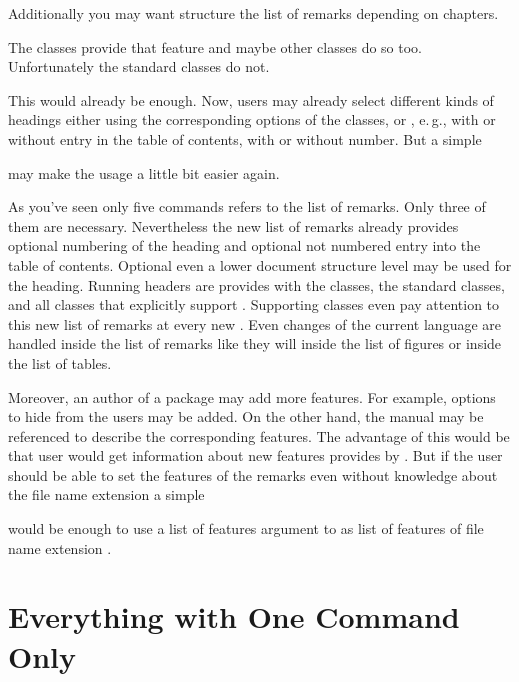 Additionally you may want structure the list of
remarks depending on chapters.
\begin{lstcode}
\end{lstcode}
The \KOMAScript{} classes provide that feature and maybe other classes do so
too. Unfortunately the standard classes do not.

This would already be enough. Now, users may already
select different kinds of headings either using the corresponding options of
the \KOMAScript{} classes, or , e.\,g., with or without entry
in the table of contents, with or without number. But a simple
\begin{lstcode}
  \newcommand*{\listofremarkboxes}{\listoftoc{lor}}
\end{lstcode}
may make the usage a little bit easier again.

As you've seen only five commands refers to the list of remarks. Only three of
them are necessary. Nevertheless the new list of remarks already provides
optional numbering of the heading and optional not numbered entry into the
table of contents. Optional even a lower document structure level may be used
for the heading. Running headers are provides with the \KOMAScript{} classes,
the standard classes, and all classes that explicitly support
. Supporting classes even pay attention to this new list of
remarks at every new . Even changes of the
current language are handled inside the list of remarks like they will inside
the list of figures or inside the list of tables.

Moreover, an author of a package may add more
features. For example, options to hide  from the users may be
added. On the other hand, the  manual may be referenced to
describe the corresponding features. The advantage of this would be that user
would get information about new features provides by . But
if the user should be able to set the features of the remarks even without
knowledge about the file name extension  a simple
\begin{lstcode}
  \newcommand*{\setupremarkboxes}{\setuptoc{lor}}
\end{lstcode}
would be enough to use a list of features argument to
 as list of features of file name extension .

\section{Everything with One Command Only}
\label{sec:tocbasic.highlevel}

